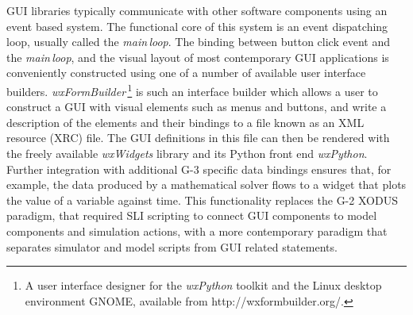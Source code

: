 \documentclass[12pt]{article}
\begin{document}
GUI libraries typically communicate with other software components
using an event based system.  The functional core of this system is an
event dispatching loop, usually called the {\it main\,loop}.
The binding between button click event and the {\it main\,loop}, and
the visual layout of most contemporary GUI applications is
conveniently constructed using one of a number of available user
interface builders.
%
%
{\it wxFormBuilder}\,\footnote{A user interface designer for the {\it
    wxPython} toolkit and the Linux desktop environment GNOME,
  available from http://wxformbuilder.org/.} is such an interface
builder which allows a user to construct a GUI with visual elements
such as menus and buttons, and write a description of the elements and
their bindings to a file known as an XML resource (XRC) file.  The GUI
definitions in this file can then be rendered with the freely
available {\it wxWidgets} library and its Python front end {\it
  wxPython}.  Further integration with additional G-3 specific data
bindings ensures that, for example, the data produced by a
mathematical solver flows to a widget that plots the value of a
variable against time.  This functionality replaces the G-2
XODUS paradigm, that required SLI scripting to connect GUI components
to model components and simulation actions, with a more contemporary
paradigm that separates simulator and model scripts from GUI related
statements.
\end{document}
